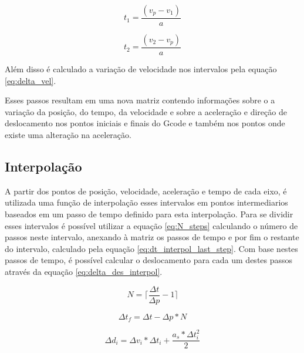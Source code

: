 \begin{equation}
    \label{eq:dt_seg_a}
    t_1 = \frac{(v_p-v_1)}{a}
\end{equation}

\begin{equation}
    \label{eq:dt_seg_a}
    t_2 = \frac{(v_2-v_p)}{a}
\end{equation}

Além disso é calculado a variação de velocidade nos intervalos pela equação \ref{eq:delta_vel}.


Esses passos resultam em uma nova matriz contendo informações
sobre o a variação da posição, do tempo, da velocidade e sobre a aceleração e 
direção de deslocamento nos pontos iniciais e finais do Gcode e também nos pontos
onde existe uma alteração na aceleração.

\subsection{Interpolação}

A partir dos pontos de posição, velocidade, aceleração e tempo de cada eixo, é utilizada uma função de interpolação esses intervalos em pontos intermediarios
baseados em um passo de tempo definido para esta interpolação.
Para se dividir esses intervalos é possível utilizar a equação \ref{eq:N_steps}
calculando o número de passos neste intervalo, anexando à matriz os passos de tempo e por fim
o restante do intervalo, calculado pela equação \ref{eq:dt_interpol_last_step}.
Com base nestes passos de tempo, é possível calcular o deslocamento para cada um destes passos
através da equação \ref{eq:delta_des_interpol}.

\begin{equation}
    \label{eq:N_steps}
    N = \lceil\frac{\Delta t}{\Delta p}-1\rceil
\end{equation}

\begin{equation}
    \label{eq:dt_interpol_last_step}
    \Delta t_f= \Delta t - \Delta p*N 
\end{equation}

\begin{equation}
    \label{eq:delta_des_interpol}
    \Delta d_i = \Delta v_i*\Delta t_i+ \frac{a_s*\Delta t_i^2}{2} 
\end{equation}

